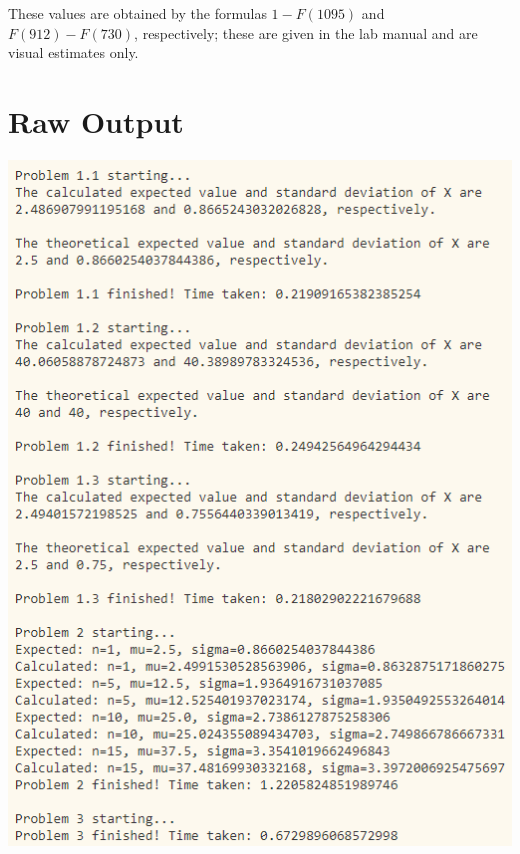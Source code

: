 \documentclass{article}
\begin{document}
These values are obtained by the formulas \(1 - F(1095)\) and
\(F(912) - F(730)\), respectively; these are given in the
lab manual and are visual estimates only.

\section{Raw Output}
\includegraphics[width=\textwidth]{Images/output}
\end{document}
